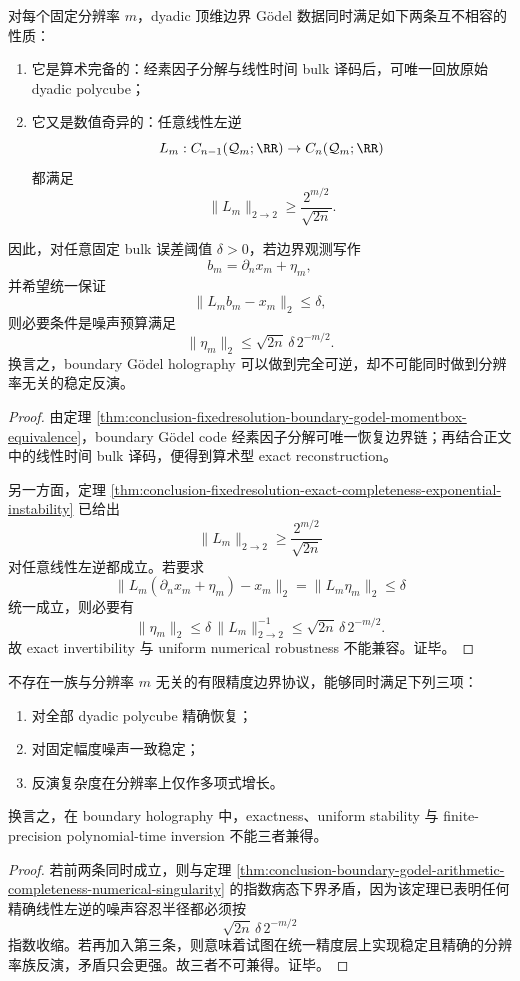 \begin{theorem}[算术完备性与数值奇异性的不可兼容]\label{thm:conclusion-boundary-godel-arithmetic-completeness-numerical-singularity}
对每个固定分辨率 \(m\)，dyadic 顶维边界 Gödel 数据同时满足如下两条互不相容的性质：
\begin{enumerate}
  \item 它是算术完备的：经素因子分解与线性时间 bulk 译码后，可唯一回放原始 dyadic polycube；
  \item 它又是数值奇异的：任意线性左逆
  \[
  L_m:C_{n-1}(\mathcal Q_m;\RR)\to C_n(\mathcal Q_m;\RR)
  \]
  都满足
  \[
  \|L_m\|_{2\to 2}\ge \frac{2^{m/2}}{\sqrt{2n}}.
  \]
\end{enumerate}
因此，对任意固定 bulk 误差阈值 \(\delta>0\)，若边界观测写作
\[
b_m=\partial_n x_m+\eta_m,
\]
并希望统一保证
\[
\|L_m b_m-x_m\|_2\le \delta,
\]
则必要条件是噪声预算满足
\[
\|\eta_m\|_2\le \sqrt{2n}\,\delta\,2^{-m/2}.
\]
换言之，boundary Gödel holography 可以做到完全可逆，却不可能同时做到分辨率无关的稳定反演。
\end{theorem}
\begin{proof}
由定理 \ref{thm:conclusion-fixedresolution-boundary-godel-momentbox-equivalence}，boundary Gödel code 经素因子分解可唯一恢复边界链；再结合正文中的线性时间 bulk 译码，便得到算术型 exact reconstruction。

另一方面，定理 \ref{thm:conclusion-fixedresolution-exact-completeness-exponential-instability} 已给出
\[
\|L_m\|_{2\to 2}\ge \frac{2^{m/2}}{\sqrt{2n}}
\]
对任意线性左逆都成立。若要求
\[
\|L_m(\partial_n x_m+\eta_m)-x_m\|_2=\|L_m\eta_m\|_2\le \delta
\]
统一成立，则必要有
\[
\|\eta_m\|_2\le \delta\,\|L_m\|_{2\to 2}^{-1}\le \sqrt{2n}\,\delta\,2^{-m/2}.
\]
故 exact invertibility 与 uniform numerical robustness 不能兼容。证毕。
\end{proof}

\begin{corollary}[有限精度全息的三性不可同得]\label{cor:conclusion-finite-precision-holography-triple-incompatibility}
不存在一族与分辨率 \(m\) 无关的有限精度边界协议，能够同时满足下列三项：
\begin{enumerate}
  \item 对全部 dyadic polycube 精确恢复；
  \item 对固定幅度噪声一致稳定；
  \item 反演复杂度在分辨率上仅作多项式增长。
\end{enumerate}
换言之，在 boundary holography 中，exactness、uniform stability 与 finite-precision polynomial-time inversion 不能三者兼得。
\end{corollary}
\begin{proof}
若前两条同时成立，则与定理 \ref{thm:conclusion-boundary-godel-arithmetic-completeness-numerical-singularity} 的指数病态下界矛盾，因为该定理已表明任何精确线性左逆的噪声容忍半径都必须按
\[
\sqrt{2n}\,\delta\,2^{-m/2}
\]
指数收缩。若再加入第三条，则意味着试图在统一精度层上实现稳定且精确的分辨率族反演，矛盾只会更强。故三者不可兼得。证毕。
\end{proof}

